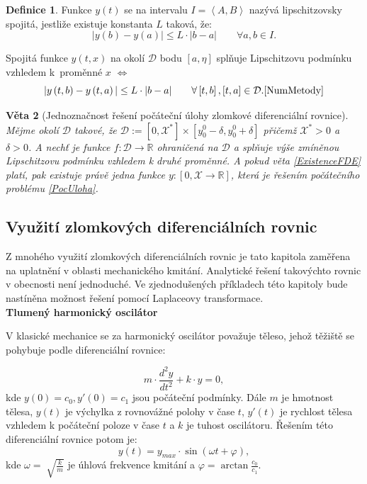 \documentclass[a4paper,12pt,twoside]{article}
\newtheorem{veta}{Věta}[section]
\theoremstyle{definition}
\newtheorem{defin}[veta]{Definice}
\theoremstyle{remark}
\numberwithin{equation}{section}
\numberwithin{table}{section}
\numberwithin{figure}{section}
\newcommand{\R}{\mathbb{R}}
\begin{document}
\begin{defin}%
	Funkce $y\left(t\right)$ se na intervalu $I = \left\langle A, B \right\rangle $ nazývá lipschitzovsky spojitá, jestliže existuje konstanta $L$ taková, že:
	$$|y\left(b\right)- y\left(a\right)| \leq L \cdot |b-a| \qquad  \forall a,b \in I.$$
\end{defin}

Spojitá funkce  $y\left(t,x\right)$ na okolí $\mathcal{D}$ bodu $\left[a, \eta\right]$ splňuje Lipschitzovu podmínku vzhledem k~proměnné $x$ $\Leftrightarrow$ 
$$ |y\left(t, b\right)- y\left( t, a\right)| \leq L \cdot |b-a| \qquad  \forall \left[t,b\right], \left[t,a\right]  \in \mathcal{D}. \cite{NumMetody} $$

\begin{veta} [Jednoznačnost řešení počáteční úlohy zlomkové diferenciální rovnice]
	Mějme okolí $\mathcal{D}$ takové, že $\mathcal{D} := \left[0,\mathcal{X} ^{*}\right] \times \left[y_{0}^{0} - \delta , y_{0}^{0} + \delta \right] $ přičemž $\mathcal{X}^{*} > 0$ a $\delta > 0$. A nechť je funkce $f: \mathcal{D} \to \R$ ohraničená na $\mathcal{D}$ a splňuje výše zmíněnou Lipschitzovu podmínku vzhledem k druhé proměnné. A pokud věta \ref{ExistenceFDE} platí, pak existuje právě jedna funkce $y:\left[0, \mathcal{X} \to \R\right]$, která je řešením počátečního problému \eqref{PocUloha}.
\end{veta}
\subsection{Využití zlomkových diferenciálních rovnic}
Z mnohého využití  zlomkových diferenciálních rovnic je tato kapitola zaměřena na uplatnění v oblasti mechanického kmitání. Analytické řešení takovýchto rovnic v obecnosti není jednoduché. Ve zjednodušených příkladech této kapitoly bude nastíněna možnost řešení pomocí Laplaceovy transformace.\\

\newpage
\noindent\textbf{Tlumený harmonický oscilátor} \label{TlumenyHarmonickyOscilator}

\medskip
\noindent V klasické mechanice se za harmonický oscilátor považuje těleso, jehož těžiště se pohybuje podle diferenciální rovnice:


\begin{equation} \label{HarmonicOscilator}
	m \cdot \frac{d^{2} y}{d t^{2}} + k \cdot y = 0,	
\end{equation}
kde $y\left(0\right) = c_{0}, y'\left(0\right) = c_{1}$ jsou počáteční podmínky. 
Dále $m$ je hmotnost tělesa, $y\left(t\right)$ je výchylka z rovnovážné polohy v čase $t$, $y'\left(t\right)$ je rychlost tělesa vzhledem k počáteční poloze v čase $t$ a $k$ je tuhost oscilátoru.
Řešením této diferenciální rovnice potom je:
\begin{equation}
	y\left(t\right)  = y_{max} \cdot \sin{\left(\omega t + \varphi\right)},
\end{equation}
kde $\omega = \sqrt[]{\frac{k}{m}}$ je úhlová frekvence kmitání a $\varphi = \arctan{\frac{c_{0}}{c_{1}}}$. \cite{HRW} \cite{Fyzika1Kulhanek}
\end{document}
